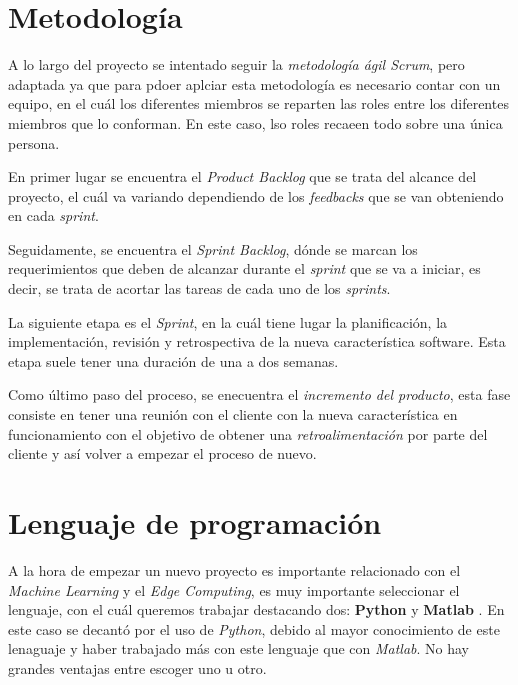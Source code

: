 
\section{Metodología}\label{scrum}
A lo largo del proyecto se intentado seguir la \textit{metodología ágil Scrum}, pero adaptada ya que para pdoer aplciar esta metodología es necesario contar con un equipo, en el cuál los diferentes miembros se reparten las roles entre los diferentes miembros que lo conforman. En este caso, lso roles recaeen todo sobre una única persona.


En primer lugar se encuentra el \textit{Product Backlog} \cite{scrum} que se trata del alcance del proyecto, el cuál va variando dependiendo de los \textit{feedbacks} que se van obteniendo en cada \textit{sprint}.

Seguidamente, se encuentra el \textit{Sprint Backlog}, dónde se marcan los requerimientos que deben de alcanzar durante el \textit{sprint} que se va a iniciar, es decir, se trata de acortar las tareas de cada uno 
de los \textit{sprints}.

La siguiente etapa es el \textit{Sprint}, en la cuál tiene lugar la planificación, la implementación, revisión y retrospectiva de la nueva característica software.
Esta etapa suele tener una duración de una a dos semanas.

Como último paso del proceso, se enecuentra el \textit{incremento del producto}, esta fase consiste en tener una reunión con el cliente con la nueva característica en funcionamiento con el objetivo de obtener una \textit{retroalimentación} por parte del cliente y así volver a empezar el proceso de nuevo.


\section{Lenguaje de programación}
A la hora de empezar un nuevo proyecto es importante relacionado con el \textit{Machine Learning} y el \textit{Edge Computing}, es muy importante seleccionar el lenguaje, con el cuál queremos trabajar destacando dos: \textbf{Python} \cite{python} y \textbf{Matlab} \cite{matlab}.
En este caso se decantó por el uso de \textit{Python}, debido al mayor conocimiento de este lenaguaje y haber trabajado más con este lenguaje que con \textit{Matlab}.
No hay grandes ventajas entre escoger uno u otro.

